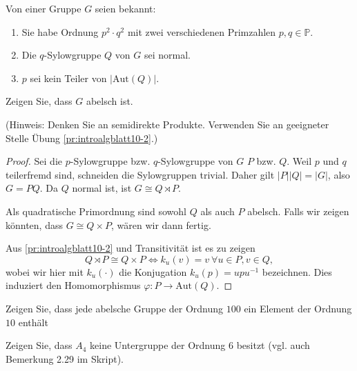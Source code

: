 \begin{Problem}
	Von einer Gruppe $G$ seien bekannt:
	\begin{enumerate}[label=(\arabic*)]
		\item Sie habe Ordnung $p^2\cdot q^2$ mit zwei verschiedenen Primzahlen $p,q\in \mathbb{P}$.
		\item Die $q$-Sylowgruppe $Q$ von $G$ sei normal.
		\item $p$ sei kein Teiler von $|\text{Aut}(Q)|$.
	\end{enumerate}
	Zeigen Sie, dass $G$ abelsch ist.

	(Hinweis: Denken Sie an semidirekte Produkte. Verwenden Sie an geeigneter Stelle Übung \ref{pr:introalgblatt10-2}.)  
\end{Problem}
\begin{proof}
	Sei die $p$-Sylowgruppe bzw. $q$-Sylowgruppe von $G$ $P$ bzw. $Q$. Weil $p$ und $q$ teilerfremd sind, schneiden die Sylowgruppen trivial. Daher gilt $|P| |Q|=|G|$, also $G=PQ$. Da $Q$ normal ist, ist $G\cong Q\rtimes P$.  

	Als quadratische Primordnung sind sowohl $Q$ als auch $P$ abelsch. Falls wir zeigen könnten, dass $G\cong Q\times P$, wären wir dann fertig.

	Aus \ref{pr:introalgblatt10-2} und Transitivität ist es zu zeigen
	\[
		Q\rtimes P\cong Q\times P \iff k_u(v)=v~\forall u\in P,v\in Q
	,\] 
	wobei wir hier mit $k_u(\cdot)$ die Konjugation $k_u(p)=upu^{-1}$ bezeichnen. Dies induziert den Homomorphismus $\varphi: P\to \text{Aut}(Q)$. 
\end{proof}
\begin{Problem}
	\begin{parts}
	\item Zeigen Sie, dass jede abelsche Gruppe der Ordnung $100$ ein Element der Ordnung $10$ enthält
	\item Zeigen Sie, dass $A_4$ keine Untergruppe der Ordnung $6$ besitzt (vgl. auch Bemerkung 2.29 im Skript).
	\end{parts}
\end{Problem}
